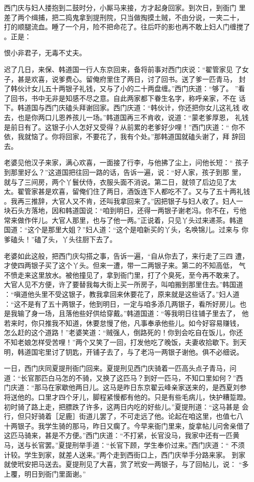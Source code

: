 西门庆与妇人搂抱到二鼓时分，小厮马来接，方才起身回家。到次日，到衙门
里差了两个缉捕，把二捣鬼拿到提刑院，只当做掏摸土贼，不由分说，一夹二十，
打的顺腿流血。睡了一个月，险不把命花了。往后吓的影也再不敢上妇人门缠搅了
。正是：

恨小非君子，无毒不丈夫。

迟了几日，来保、韩道国一行人东京回来，备将前事对西门庆说：“翟管家见
了女子，甚是欢喜，说爹费心。留俺府里住了两日，讨了回书。送了爹一匹青马，
封了韩伙计女儿五十两银子礼钱，又与了小的二十两盘缠。”西门庆道：“够了。
”看了回书，书中无非是知感不尽之意。自此两家都下眷生名字，称呼亲家，不在
话下。韩道国与西门庆磕头拜谢回家。西门庆道：“韩伙计，你还把你女儿这礼钱
收去，也是你两口儿恩养孩儿一场。”韩道国再三不肯收，说道：“蒙老爹厚恩，
礼钱是前日有了。这银子小人怎好又受得？从前累的老爹好少哩！”西门庆道：“
你不依，我就恼了。你将回家，不要花了，我有个处。”那韩道国就磕头谢了，拜
辞回去。

老婆见他汉子来家，满心欢喜，一面接了行李，与他拂了尘上，问他长短：“
孩子到那里好么？”这道国把往回一路的话，告诉一遍，说：“好人家，孩子到那
里，就与了三间房，两个丫鬟伏侍，衣服头面不消说。第二日，就领了后边见了太
太。翟管家甚是欢喜，留俺们住了两日，酒饭连下人都吃不了。又与了五十两礼钱
。我再三推辞，大官人又不肯，还叫我拿回来了。”因把银子与妇人收了。妇人一
块石头方落地，因和韩道国说：“咱到明日，还得一两银子谢老冯。你不在，亏他
常来做作伴儿。大官人那里，也与了他一两。”正说着，只见丫头过来递茶。韩道
国道：“这个是那里大姐？”妇人道：“这个是咱新买的丫头，名唤锦儿。过来与
你爹磕头！”磕了头，丫头往厨下去了。

老婆如此这般，把西门庆勾搭之事，告诉一遍，“自从你去了，来行走了三四
遭，才使四两银子买了这个丫头。但来一遭，带一二两银子来。第二的不知高低，
气不愤走来这里放水。被他撞见了，拿到衙门里，打了个臭死，至今再不敢来了。
大官人见不方便，许了要替我每大街上买一所房子，叫咱搬到那里住去。”韩国道
：“嗔道他头里不受这银子，教我拿回来休要花了，原来就是这些话了。”妇人道
：“这不是有了五十两银子，他到明日，一定与咱多添几两银子，看所好房儿。也
是我输了身一场，且落他些好供给穿戴。”韩道国道：“等我明日往铺子里去了，
他若来时，你只推我不知道，休要怠慢了他，凡事奉承他些儿。如今好容易赚钱，
怎么赶的这个道路！”老婆笑道：“贼强人，倒路死的！你到会吃自在饭儿，你还
不知老娘怎样受苦哩！”两个又笑了一回，打发他吃了晚饭，夫妻收拾歇下。到天
明，韩道国宅里讨了钥匙，开铺子去了，与了老冯一两银子谢他。俱不必细说。

一日，西门庆同夏提刑衙门回来。夏提刑见西门庆骑着一匹高头点子青马，问
道：“长官那匹白马怎的不骑，又换了这匹马？到好一匹马，不知口里如何？”西
门庆道：“那马在家歇他两日儿。这马是昨日东京翟云峰亲家送来的，是西夏刘参
将送他的。口里才四个牙儿，脚程紧慢都有他的。只是有些毛病儿，快护糟踅蹬。
初时骑了路上走，把膘跌了许多，这两日内吃的好些儿。”夏提刑道：“这马甚是
会行，但只好骑着［足鹿］街道儿罢了，不可走远了他。论起在咱这里，也值七八
十两银子。我学生骑的那马，昨日又瘸了。今早来衙门里来，旋拿帖儿问舍亲借了
这匹马骑来，甚是不方便。”西门庆道：“不打紧，长官没马，我家中还有一匹黄
马，送与长官罢。”夏提刑举手道：“长官下顾，学生奉价过来。”西门庆道：“
不须计较。学生到家，就差人送来。”两个走到西街口上，西门庆举手分路来家。
到家就使玳安把马送去。夏提刑见了大喜，赏了玳安一两银子，与了回帖儿，说：
“多上覆，明日到衙门里面谢。”

